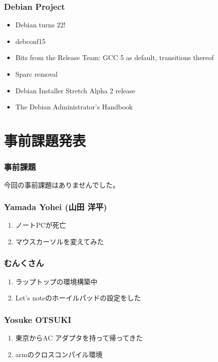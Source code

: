 \documentclass[cjk,dvipdfmx,10pt,compress,%
hyperref={bookmarks=true,bookmarksnumbered=true,bookmarksopen=false,%
colorlinks=false,%
pdftitle={第 101 回 関西 Debian 勉強会},%
pdfauthor={倉敷・のがた・佐々木・かわだ},%
pdfsubject={資料},%
}]{beamer}
\begin{document}
\begin{frame}[fragile]
  \frametitle{Debian Project}
  \begin{itemize}
  \item Debian turns 22!
  \item debconf15
  \item Bits from the Release Team: GCC 5 as default, transitions thereof
  \item Sparc removal
  \item Debian Installer Stretch Alpha 2 release
  \item The Debian Administrator's Handbook
  \end{itemize}
\end{frame}


\section{事前課題発表}


\begin{frame}[fragile]
  \frametitle{事前課題}
  今回の事前課題はありませんでした。
\end{frame}


\begin{frame}
  \frametitle{ Yamada Yohei (山田 洋平) }
  \begin{enumerate}
  \item ノートPCが死亡
  \item マウスカーソルを変えてみた
  \end{enumerate}
\end{frame}

\begin{frame}
  \frametitle{ むんくさん }
  \begin{enumerate}
  \item ラップトップの環境構築中
  \item Let's noteのホーイルパッドの設定をした
  \end{enumerate}
\end{frame}

\begin{frame}
  \frametitle{ Yosuke OTSUKI }
  \begin{enumerate}
  \item 東京からAC アダプタを持って帰ってきた
  \item armのクロスコンパイル環境
  \end{enumerate}
\end{frame}
\end{document}
